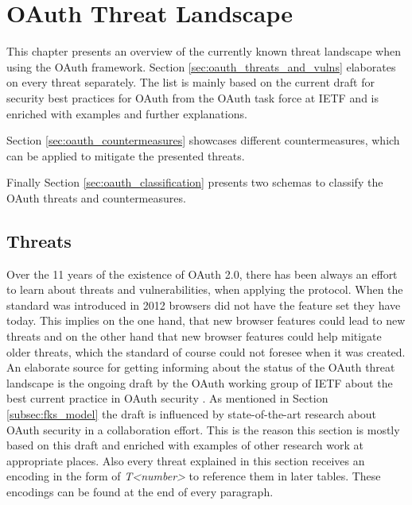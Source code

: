 \documentclass[
    fontsize=12pt,
    headings=small,
    parskip=half,           %
    bibliography=totoc,
    numbers=noenddot,       %
    open=any,               %
    ]{scrreprt}
\begin{document}
\chapter{OAuth Threat Landscape}
\label{chap:oauth_security}

This chapter presents an overview of the currently known threat landscape when using the OAuth framework. Section \ref{sec:oauth_threats_and_vulns} elaborates on every threat separately. The list is mainly based on the current draft for security best practices for OAuth from the OAuth task force at IETF \cite{lodderstedt2020oauth} and is enriched with examples and further explanations.

Section \ref{sec:oauth_countermeasures} showcases different countermeasures, which can be applied to mitigate the presented threats. 

Finally Section \ref{sec:oauth_classification} presents two schemas to classify the OAuth threats and countermeasures.

\section{Threats}
\label{sec:oauth_threats}
Over the 11 years of the existence of OAuth 2.0, there has been always an effort to learn about threats and vulnerabilities, when applying the protocol. When the standard was introduced in 2012 browsers did not have the feature set they have today. This implies on the one hand, that new browser features could lead to new threats and on the other hand that new browser features could help mitigate older threats, which the standard of course could not foresee when it was created. An elaborate source for getting informing about the status of the OAuth threat landscape is the ongoing draft by the OAuth working group of IETF about the best current practice in OAuth security \cite{lodderstedt2020oauth}. As mentioned in Section \ref{subsec:fks_model} the draft is influenced by state-of-the-art research about OAuth security in a collaboration effort. This is the reason this section is mostly based on this draft and enriched with examples of other research work at appropriate places. Also every threat explained in this section receives an encoding in the form of \emph{T<number>} to reference them in later tables. These encodings can be found at the end of every paragraph.
\end{document}
